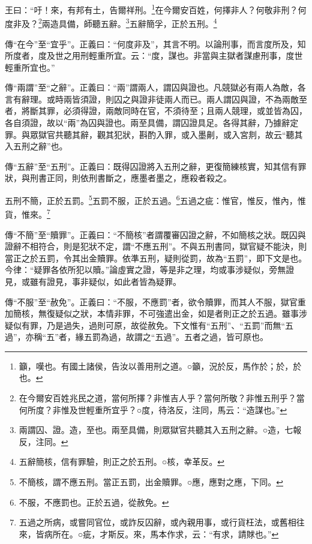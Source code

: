 王曰：“吁！來，有邦有土，告爾祥刑。\footnote{籲，嘆也。有國土諸侯，告汝以善用刑之道。○籲，況於反，馬作於；於，於也。}在今爾安百姓，何擇非人？何敬非刑？何度非及？\footnote{在今爾安百姓兆民之道，當何所擇？非惟吉人乎？當何所敬？非惟五刑乎？當何所度？非惟及世輕重所宜乎？○度，待洛反，注同，馬云：“造謀也。”}兩造具備，師聽五辭。\footnote{兩謂囚、證。造，至也。兩至具備，則眾獄官共聽其入五刑之辭。○造，七報反，注同。}五辭簡孚，正於五刑。\footnote{五辭簡核，信有罪驗，則正之於五刑。○核，幸革反。}


{\noindent\zhuan{}\fzbyks 傳“在今”至“宜乎”。正義曰：“何度非及”，其言不明。以論刑事，而言度所及，知所度者，度及世之用刑輕重所宜。云：“度，謀也。非當與主獄者謀慮刑事，度世輕重所宜也。” \par}

{\noindent\zhuan{}\fzbyks 傳“兩謂”至“之辭”。正義曰：“兩”謂兩人，謂囚與證也。凡競獄必有兩人為敵，各言有辭理。或時兩皆須證，則囚之與證非徒兩人而已。兩人謂囚與證，不為兩敵至者，將斷其罪，必須得證，兩敵同時在官，不須待至；且兩人競理，或並皆為囚，各自須證，故以“兩”為囚與證也。兩至具備，謂囚證具足。各得其辭，乃據辭定罪。與眾獄官共聽其辭，觀其犯狀，斟酌入罪，或入墨劓，或入宮剕，故云“聽其入五刑之辭”也。 \par}

{\noindent\zhuan{}\fzbyks 傳“五辭”至“五刑”。正義曰：既得囚證將入五刑之辭，更復簡練核實，知其信有罪狀，與刑書正同，則依刑書斷之，應墨者墨之，應殺者殺之。 \par}

五刑不簡，正於五罰。\footnote{不簡核，謂不應五刑。當正五罰，出金贖罪。○應，應對之應，下同。}五罰不服，正於五過。\footnote{不服，不應罰也。正於五過，從赦免。}五過之疵：惟官，惟反，惟內，惟貨，惟來。\footnote{五過之所病，或嘗同官位，或詐反囚辭，或內親用事，或行貨枉法，或舊相往來，皆病所在。○疵，才斯反。來，馬本作求，云：“有求，請賕也。”}


{\noindent\zhuan{}\fzbyks 傳“不簡”至“贖罪”。正義曰：“不簡核”者謂覆審囚證之辭，不如簡核之狀。既囚與證辭不相符合，則是犯狀不定，謂“不應五刑”。不與五刑書同，獄官疑不能決，則當正之於五罰，令其出金贖罪。依準五刑，疑則從罰，故為“五罰”，即下文是也。今律：“疑罪各依所犯以贖。”論虛實之證，等是非之理，均或事涉疑似，旁無證見，或雖有證見，事非疑似，如此者皆為疑罪。 \par}

{\noindent\zhuan{}\fzbyks 傳“不服”至“赦免”。正義曰：“不服，不應罰”者，欲令贖罪，而其人不服，獄官重加簡核，無復疑似之狀，本情非罪，不可強遣出金，如是者則正之於五過。雖事涉疑似有罪，乃是過失，過則可原，故從赦免。下文惟有“五刑”、“五罰”而無“五過”，亦稱“五”者，緣五罰為過，故謂之“五過”。五者之過，皆可原也。 \par}

